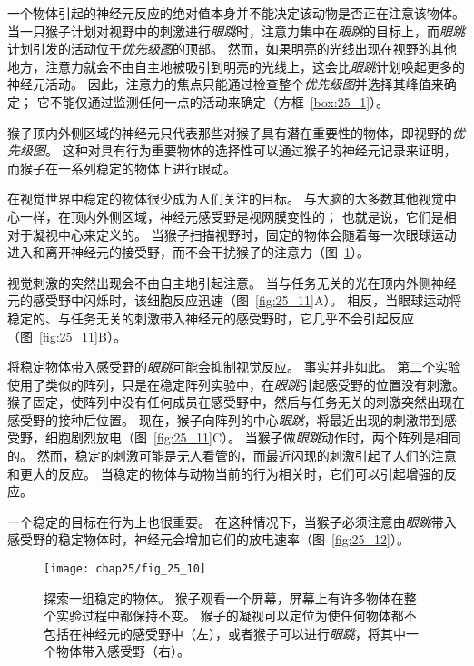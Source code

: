 一个物体引起的神经元反应的绝对值本身并不能决定该动物是否正在注意该物体。
当一只猴子计划对视野中的刺激进行\textit{眼跳}时，注意力集中在\textit{眼跳}的目标上，而\textit{眼跳}计划引发的活动位于\textit{优先级图}的顶部。
然而，如果明亮的光线出现在视野的其他地方，注意力就会不由自主地被吸引到明亮的光线上，这会比\textit{眼跳}计划唤起更多的神经元活动。
因此，注意力的焦点只能通过检查整个\textit{优先级图}并选择其峰值来确定；
它不能仅通过监测任何一点的活动来确定（方框~\ref{box:25_1}）。


\begin{proposition} \label{box:25_1}
	
	\quad \quad 猴子顶内外侧区域的神经元只代表那些对猴子具有潜在重要性的物体，即视野的\textit{优先级图}。
	这种对具有行为重要物体的选择性可以通过猴子的神经元记录来证明，而猴子在一系列稳定的物体上进行眼动。
	
	\quad \quad 在视觉世界中稳定的物体很少成为人们关注的目标。
	与大脑的大多数其他视觉中心一样，在顶内外侧区域，神经元感受野是视网膜变性的；
	也就是说，它们是相对于凝视中心来定义的。
	当猴子扫描视野时，固定的物体会随着每一次眼球运动进入和离开神经元的接受野，而不会干扰猴子的注意力（图~\ref{fig:25_10}）。
	
	\quad \quad 视觉刺激的突然出现会不由自主地引起注意。
	当与任务无关的光在顶内外侧神经元的感受野中闪烁时，该细胞反应迅速（图~\ref{fig:25_11}A）。
	相反，当眼球运动将稳定的、与任务无关的刺激带入神经元的感受野时，它几乎不会引起反应（图~\ref{fig:25_11}B）。
	
	\quad \quad 将稳定物体带入感受野的\textit{眼跳}可能会抑制视觉反应。
	事实并非如此。
	第二个实验使用了类似的阵列，只是在稳定阵列实验中，在\textit{眼跳}引起感受野的位置没有刺激。
	猴子固定，使阵列中没有任何成员在感受野中，然后与任务无关的刺激突然出现在感受野的接种后位置。
	现在，猴子向阵列的中心\textit{眼跳}，将最近出现的刺激带到感受野，细胞剧烈放电（图~\ref{fig:25_11}C）。
	当猴子做\textit{眼跳}动作时，两个阵列是相同的。
	然而，稳定的刺激可能是无人看管的，而最近闪现的刺激引起了人们的注意和更大的反应。
	当稳定的物体与动物当前的行为相关时，它们可以引起增强的反应。
	
	\quad \quad 一个稳定的目标在行为上也很重要。
	在这种情况下，当猴子必须注意由\textit{眼跳}带入感受野的稳定物体时，神经元会增加它们的放电速率（图~\ref{fig:25_12}）。
	
\end{proposition}


\begin{figure}[htbp]
	\centering
	\texttt{[image: chap25/fig\_25\_10]}
	\caption{探索一组稳定的物体。
		猴子观看一个屏幕，屏幕上有许多物体在整个实验过程中都保持不变。
		猴子的凝视可以定位为使任何物体都不包括在神经元的感受野中（左），或者猴子可以进行\textit{眼跳}，将其中一个物体带入感受野（右）。}
	\label{fig:25_10}
\end{figure}


